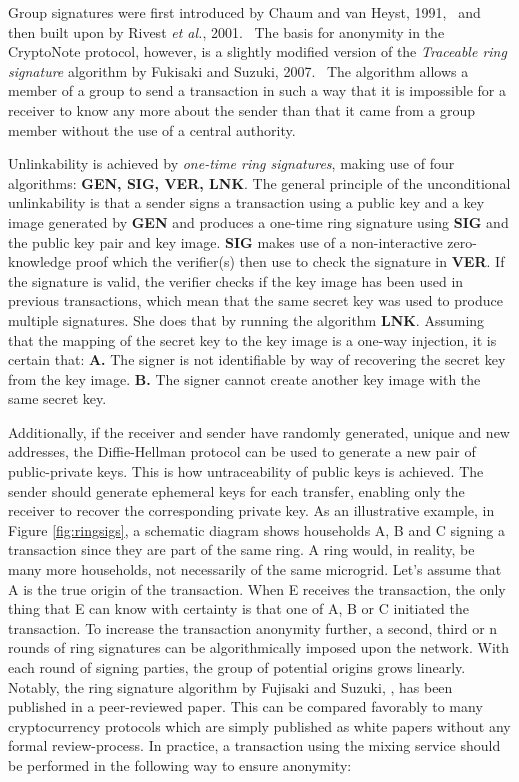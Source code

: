 Group signatures were first introduced by Chaum and van Heyst, 1991,~\cite{Chaum1991} and then built upon by Rivest \textit{et al.}, 2001.~\cite{Rivest2001} The basis for anonymity in the CryptoNote protocol, however, is a slightly modified version of the \textit{Traceable ring signature} algorithm by Fukisaki and Suzuki, 2007.~\cite{Fujisaki2007} The algorithm allows a member of a group to send a transaction in such a way that it is impossible for a receiver to know any more about the sender than that it came from a group member without the use of a central authority.

Unlinkability is achieved by \textit{one-time ring signatures}, making use of four algorithms: \textbf{GEN, SIG, VER, LNK}. The general principle of the unconditional unlinkability is that a sender signs a transaction using a public key and a key image generated by \textbf{GEN} and produces a one-time ring signature using \textbf{SIG} and the public key pair and key image. \textbf{SIG} makes use of a non-interactive zero-knowledge proof which the verifier(s) then use to check the signature in \textbf{VER}. If the signature is valid, the verifier checks if the key image has been used in previous transactions, which mean that the same secret key was used to produce multiple signatures. She does that by running the algorithm \textbf{LNK}. Assuming that the mapping of the secret key to the key image is a one-way injection, it is certain that: \textbf{A.} The signer is not identifiable by way of recovering the secret key from the key image. \textbf{B.} The signer cannot create another key image with the same secret key. 

Additionally, if the receiver and sender have randomly generated, unique and new addresses, the Diffie-Hellman protocol can be used to generate a new pair of public-private keys. This is how untraceability of public keys is achieved. The sender should generate ephemeral keys for each transfer, enabling only the receiver to recover the corresponding private key. As an illustrative example, in Figure \ref{fig:ringsigs}, a schematic diagram shows households A, B and C signing a transaction since they are part of the same ring. A ring would, in reality, be many more households, not necessarily of the same microgrid. Let's assume that A is the true origin of the transaction. When E receives the transaction, the only thing that E can know with certainty is that one of A, B or C initiated the transaction. To increase the transaction anonymity further, a second, third or n rounds of ring signatures can be algorithmically imposed upon the network. With each round of signing parties, the group of potential origins grows linearly. Notably, the ring signature algorithm by Fujisaki and Suzuki, \cite{Fujisaki2007}, has been published in a peer-reviewed paper. This can be compared favorably to many cryptocurrency protocols which are simply published as white papers without any formal review-process. \cite{cryptonote}
In practice, a transaction using the mixing service should be performed in the following way to ensure anonymity:


